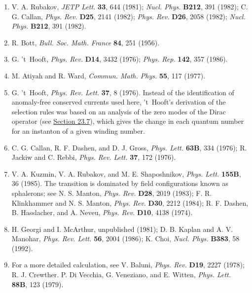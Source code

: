 \begin{enumerate}
\item {}\label{ch23-ref-21}
V. A. Rubakov, \emph{JETP Lett.} \textbf{33}, 644 (1981);
\emph{Nucl. Phys.} \textbf{B212}, 391 (1982); C. G. Callan,
\emph{Phys. Rev.} \textbf{D25}, 2141 (1982); \emph{Phys. Rev.}
\textbf{D26}, 2058 (1982); \emph{Nucl. Phys.} \textbf{B212}, 391
(1982).

\item {}\label{ch23-ref-22}
R. Bott, \emph{Bull. Soc. Math. France} \textbf{84}, 251 (1956).

\item {}\label{ch23-ref-23}
G. 't~Hooft, \emph{Phys. Rev.} \textbf{D14}, 3432 (1976);
\emph{Phys. Rep.} \textbf{142}, 357 (1986).

\item {}\label{ch23-ref-24}
M. Atiyah and R. Ward, \emph{Commun. Math. Phys.} \textbf{55}, 117
(1977).

\item {}\label{ch23-ref-25}
G. 't~Hooft, \emph{Phys. Rev. Lett.} \textbf{37}, 8 (1976). Instead
of the identification of anomaly-free conserved currents used here,
't~Hooft's derivation of the selection rules was based on an analysis of
the zero modes of the Dirac operator (see
\hyperref[sec:23.7]{Section 23.7}), which gives the change in each quantum
number for an instanton of a given winding number.

\item {}\label{ch23-ref-26}
C. G. Callan, R. F. Dashen, and D. J. Gross, \emph{Phys. Lett.}
\textbf{63B}, 334 (1976); R. Jackiw and C. Rebbi,
\emph{Phys. Rev. Lett.} \textbf{37}, 172 (1976).

\item {}\label{ch23-ref-27}
V. A. Kuzmin, V. A. Rubakov, and M. E. Shaposhnikov,
\emph{Phys. Lett.} \textbf{155B}, 36 (1985). The transition is dominated
by field configurations known as sphalerons; see N. S. Manton,
\emph{Phys. Rev.} \textbf{D28}, 2019 (1983); F. R. Klinkhammer and
N. S. Manton, \emph{Phys. Rev.} \textbf{D30}, 2212 (1984);
R. F. Dashen, B. Hasslacher, and A. Neveu, \emph{Phys. Rev.}
\textbf{D10}, 4138 (1974).

\item {}\label{ch23-ref-28}
H. Georgi and I. McArthur, unpublished (1981); D. B. Kaplan and
A. V. Manohar, \emph{Phys. Rev. Lett.} \textbf{56}, 2004 (1986);
K. Choi, \emph{Nucl. Phys.} \textbf{B383}, 58 (1992).

\item {}\label{ch23-ref-29}
For a more detailed calculation, see V. Baluni, \emph{Phys. Rev.}
\textbf{D19}, 2227 (1978); R. J. Crewther. P. Di Vecchia,
G. Veneziano, and E. Witten, \emph{Phys. Lett.} \textbf{88B}, 123
(1979).


\end{enumerate}
